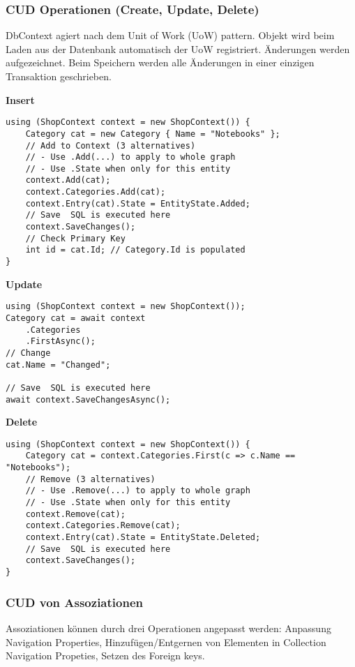 \subsubsection{CUD Operationen (Create, Update, Delete)}
DbContext agiert nach dem Unit of Work (UoW) pattern. Objekt wird beim Laden aus der
Datenbank automatisch der UoW registriert. Änderungen werden aufgezeichnet. Beim Speichern werden alle Änderungen in einer einzigen Transaktion geschrieben.

\textbf{Insert}
\begin{lstlisting}
using (ShopContext context = new ShopContext()) {
    Category cat = new Category { Name = "Notebooks" };
    // Add to Context (3 alternatives)
    // - Use .Add(...) to apply to whole graph
    // - Use .State when only for this entity
    context.Add(cat);
    context.Categories.Add(cat);
    context.Entry(cat).State = EntityState.Added;
    // Save  SQL is executed here
    context.SaveChanges();
    // Check Primary Key
    int id = cat.Id; // Category.Id is populated
}
\end{lstlisting}

\textbf{Update}
\begin{lstlisting}
using (ShopContext context = new ShopContext()); 
Category cat = await context
	.Categories 
	.FirstAsync();
// Change 
cat.Name = "Changed";

// Save  SQL is executed here 
await context.SaveChangesAsync();
\end{lstlisting}

\textbf{Delete}
\begin{lstlisting}
using (ShopContext context = new ShopContext()) {
    Category cat = context.Categories.First(c => c.Name == "Notebooks");
    // Remove (3 alternatives)
    // - Use .Remove(...) to apply to whole graph
    // - Use .State when only for this entity
    context.Remove(cat);
    context.Categories.Remove(cat);
    context.Entry(cat).State = EntityState.Deleted;
    // Save  SQL is executed here
    context.SaveChanges();              
}
\end{lstlisting}

\subsubsection{CUD von Assoziationen}
Assoziationen können durch drei Operationen angepasst werden: Anpassung Navigation Properties, Hinzufügen/Entgernen von Elementen in Collection Navigation Propeties, Setzen des Foreign keys.

